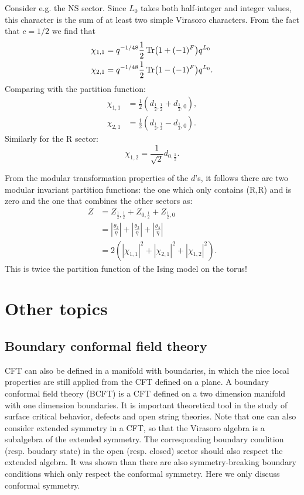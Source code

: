 \documentclass[submission, PhysLectNotes]{SciPost}
\begin{document}
Consider e.g. the NS sector. Since $L_0$ takes both half-integer and integer values, this character is the sum of at least two simple Virasoro characters. From the fact that $c=1/2$ we find that
\begin{align}
	\chi_{1,1} &= q^{-1/48}\frac{1}{2}\Tr(1+(-1)^F)q^{L_0}\\
	\chi_{2,1} &= q^{-1/48}\frac{1}{2}\Tr(1-(-1)^F)q^{L_0}.
\end{align}
Comparing with the partition function:
\begin{align}
	\chi_{1,1} &= \frac{1}{2}\left(d_{\frac{1}{2},\frac{1}{2}} + d_{\frac{1}{2},0}\right),\\
	\chi_{2,1} &= \frac{1}{2}\left(d_{\frac{1}{2},\frac{1}{2}} - d_{\frac{1}{2},0}\right).
\end{align}
Similarly for the R sector:
\begin{equation}
	\chi_{1,2} = \frac{1}{\sqrt{2}}d_{0,\frac{1}{2}}.
\end{equation}

From the modular transformation properties of the $d$'s, it follows there are two modular invariant partition functions: the one which only contains (R,R) and is zero and the one that combines the other sectors as:
\begin{align}
	Z &= Z_{\frac{1}{2},\frac{1}{2}} + Z_{0,\frac{1}{2}} + Z_{\frac{1}{2},0}\\
	&= \left|\frac{\theta_2}{\eta}\right| + \left|\frac{\theta_3}{\eta}\right| + \left|\frac{\theta_4}{\eta}\right|\\
	&= 2\left(|\chi_{1,1}|^2 + |\chi_{2,1}|^2 + |\chi_{1,2}|^2\right).
\end{align}
This is twice the partition function of the Ising model on the torus!

\section{Other topics}
\subsection{Boundary conformal field theory}
CFT can also be defined in a manifold with boundaries, in which the nice local properties are still applied from the CFT defined on a plane. A boundary conformal field theory (BCFT) is a CFT defined on a two dimension manifold with one dimension boundaries. It is important theoretical tool in the study of surface critical behavior, defects and open string theories. Note that one can also consider extended symmetry in a CFT, so that the Virasoro algebra is a subalgebra of the extended symmetry. The corresponding boundary condition (resp. boudary state) in the open (resp. closed) sector should also respect the extended algebra. It was shown than there are also symmetry-breaking boundary conditions which only respect the conformal symmetry. Here we only discuss conformal symmetry. 
\end{document}
